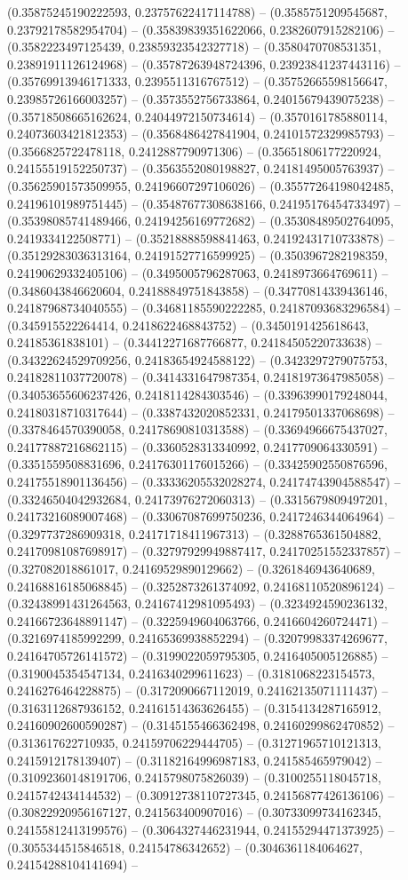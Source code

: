 (0.35875245190222593, 0.23757622417114788) -- (0.3585751209545687, 0.23792178582954704) -- (0.35839839351622066, 0.2382607915282106) -- (0.3582223497125439, 0.23859323542327718) -- (0.3580470708531351, 0.23891911126124968) -- (0.35787263948724396, 0.23923841237443116) -- (0.35769913946171333, 0.2395511316767512) -- (0.35752665598156647, 0.23985726166003257) -- (0.3573552756733864, 0.24015679439075238) -- (0.35718508665162624, 0.24044972150734614) -- (0.3570161785880114, 0.24073603421812353) -- (0.3568486427841904, 0.24101572329985793) -- (0.3566825722478118, 0.2412887790971306) -- (0.35651806177220924, 0.24155519152250737) -- (0.3563552080198827, 0.24181495005763937) -- (0.35625901573509955, 0.24196607297106026) -- (0.35577264198042485, 0.24196101989751445) -- (0.35487677308638166, 0.24195176454733497) -- (0.35398085741489466, 0.24194256169772682) -- (0.35308489502764095, 0.2419334122508771) -- (0.35218888598841463, 0.24192431710733878) -- (0.35129283036313164, 0.24191527716599925) -- (0.3503967282198359, 0.24190629332405106) -- (0.3495005796287063, 0.2418973664769611) -- (0.3486043846620604, 0.24188849751843858) -- (0.34770814339436146, 0.24187968734040555) -- (0.34681185590222285, 0.24187093683296584) -- (0.345915522264414, 0.2418622468843752) -- (0.3450191425618643, 0.24185361838101) -- (0.34412271687766877, 0.24184505220733638) -- (0.34322624529709256, 0.24183654924588122) -- (0.3423297279075753, 0.24182811037720078) -- (0.3414331647987354, 0.24181973647985058) -- (0.34053655606237426, 0.2418114284303546) -- (0.33963990179248044, 0.24180318710317644) -- (0.3387432020852331, 0.24179501337068698) -- (0.3378464570390058, 0.24178690810313588) -- (0.33694966675437027, 0.24177887216862115) -- (0.3360528313340992, 0.2417709064330591) -- (0.3351559508831696, 0.24176301176015266) -- (0.33425902550876596, 0.24175518901136456) -- (0.33336205532028274, 0.24174743904588547) -- (0.33246504042932684, 0.24173976272060313) -- (0.3315679809497201, 0.24173216089007468) -- (0.33067087699750236, 0.2417246344064964) -- (0.3297737286909318, 0.24171718411967313) -- (0.3288765361504882, 0.24170981087698917) -- (0.32797929949887417, 0.24170251552337857) -- (0.327082018861017, 0.24169529890129662) -- (0.3261846943640689, 0.24168816185068845) -- (0.3252873261374092, 0.24168110520896124) -- (0.32438991431264563, 0.24167412981095493) -- (0.3234924590236132, 0.24166723648891147) -- (0.3225949604063766, 0.2416604260724471) -- (0.3216974185992299, 0.24165369938852294) -- (0.32079983374269677, 0.24164705726141572) -- (0.3199022059795305, 0.2416405005126885) -- (0.3190045354547134, 0.2416340299611623) -- (0.3181068223154573, 0.2416276464228875) -- (0.3172090667112019, 0.24162135071111437) -- (0.3163112687936152, 0.24161514363626455) -- (0.3154134287165912, 0.24160902600590287) -- (0.3145155466362498, 0.24160299862470852) -- (0.313617622710935, 0.24159706229444705) -- (0.31271965710121313, 0.2415912178139407) -- (0.31182164996987183, 0.241585465979042) -- (0.31092360148191706, 0.2415798075826039) -- (0.3100255118045718, 0.2415742434144532) -- (0.30912738110727345, 0.24156877426136106) -- (0.30822920956167127, 0.241563400907016) -- (0.30733099734162345, 0.24155812413199576) -- (0.3064327446231944, 0.24155294471373925) -- (0.3055344515846518, 0.24154786342652) -- (0.3046361184064627, 0.24154288104141694) -- 